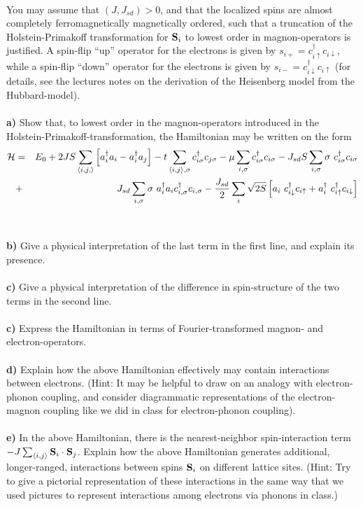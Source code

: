 \begin{problem}
\begin{eqnarray}
\end{eqnarray}
You may assume that $(J,J_{sd}) > 0$, and that the localized spins are almost completely ferromagnetically magnetically ordered, such that a truncation of the Holstein-Primakoff transformation for ${\bf S}_i$ to lowest order in magnon-operators is justified. A spin-flip ``up'' operator for the electrons is given by 
${s}_{i+} = c^{\dagger}_{i \uparrow} c_{i \downarrow}$, while a spin-flip ``down'' operator for the electrons is given by 
${s}_{i-} = c^{\dagger}_{i \downarrow} c_{i \uparrow}$ 
(for details, see the lectures notes on the derivation of the Heisenberg model from the Hubbard-model).   
\ \\
\ \\
{\bf a)} Show that, to lowest order in the magnon-operators introduced in the Holstein-Primakoff-transformation,  the Hamiltonian may be written on the form
\begin{eqnarray}
	\mathcal{H} & = & E_0 + 2JS \sum_{\langle i,j, \rangle} \left[ a^{\dagger}_i a_i -  a^{\dagger}_i a_j  \right]
	- t \sum_{\langle i,j \rangle, \sigma } c^{\dagger}_{i \sigma}c_{j \sigma} - \mu \sum_{i,\sigma} c^{\dagger}_{i \sigma}c_{i \sigma}
	- J_{sd}  S \sum_{i,\sigma} \sigma ~c^{\dagger}_{i \sigma}c_{i \sigma} \nonumber \\
	& + & J_{sd} \sum_{i,\sigma} \sigma ~
	a^{\dagger}_{i} a_{i} c^{\dagger}_{i, \sigma} c_{i,\sigma} - \frac{J_{sd}}{2} \sum_i \sqrt{2S}\left[ a_i  ~c^{\dagger}_{i \downarrow} c_{i \uparrow}+ a^{\dagger}_{i} ~ c^{\dagger}_{i \uparrow} c_{i \downarrow}  \right] \nonumber
\end{eqnarray}
\ \\
\ \\
{\bf b)} Give a physical interpretation of the last term in the first line, and explain its presence. 
\ \\
\ \\
{\bf c)} Give a physical interpretation of the difference in spin-structure of the two terms in the second line.
\ \\
\ \\
{\bf c)} Express the Hamiltonian in terms of Fourier-transformed magnon- and electron-operators. 
\ \\
\ \\
{\bf d)} Explain how the above Hamiltonian effectively may contain interactions between electrons. (Hint: It may be helpful to draw on an analogy with electron-phonon coupling, and consider diagrammatic representations of the electron-magnon coupling like we did in class for electron-phonon coupling). 
\ \\
\ \\
{\bf e)} In the above Hamiltonian, there is the nearest-neighbor spin-interaction term $-J \sum_{\langle i,j \rangle} {\bf S}_i \cdot {\bf S}_j$. Explain how the above Hamiltonian generates additional, longer-ranged, interactions between spins ${\bf S}_i$ on different lattice sites. (Hint: Try to give a pictorial representation of these interactions in the same way that we used pictures to represent interactions among electrons via phonons in class.)
\end{problem}



